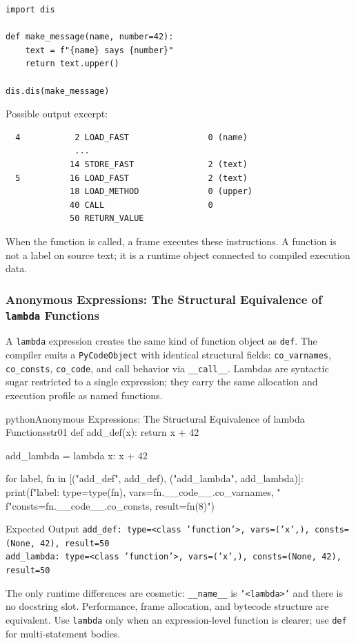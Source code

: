 \begin{verbatim}
import dis

def make_message(name, number=42):
    text = f"{name} says {number}"
    return text.upper()

dis.dis(make_message)
\end{verbatim}

Possible output excerpt:

\begin{verbatim}
  4           2 LOAD_FAST                0 (name)
              ...
             14 STORE_FAST               2 (text)
  5          16 LOAD_FAST                2 (text)
             18 LOAD_METHOD              0 (upper)
             40 CALL                     0
             50 RETURN_VALUE
\end{verbatim}

When the function is called, a frame executes these instructions. A function is not a label on source text; it is a runtime object connected to compiled execution data.

\subsubsection{Anonymous Expressions: The Structural Equivalence of \texttt{lambda} Functions}

A \texttt{lambda} expression creates the same kind of function object as \texttt{def}. The compiler emits a \texttt{PyCodeObject} with identical structural fields: \texttt{co\_varnames}, \texttt{co\_consts}, \texttt{co\_code}, and call behavior via \texttt{\_\_call\_\_}. Lambdas are syntactic sugar restricted to a single expression; they carry the same allocation and execution profile as named functions.

\begin{codebox}[]{python}{Anonymous Expressions: The Structural Equivalence of lambda Functions}{str01}
def add_def(x):
    return x + 42

add_lambda = lambda x: x + 42

for label, fn in [("add_def", add_def), ("add_lambda", add_lambda)]:
    print(f"{label}: type={type(fn)}, vars={fn.__code__.co_varnames}, "
          f"consts={fn.__code__.co_consts}, result={fn(8)}")
\end{codebox}


\begin{iobox}{Expected Output}
\texttt{add\_def: type=<class 'function'>, vars=('x',), consts=(None, 42), result=50} \\
\texttt{add\_lambda: type=<class 'function'>, vars=('x',), consts=(None, 42), result=50} \\
\end{iobox}




The only runtime differences are cosmetic: \texttt{\_\_name\_\_} is \texttt{'<lambda>'} and there is no docstring slot. Performance, frame allocation, and bytecode structure are equivalent. Use \texttt{lambda} only when an expression-level function is clearer; use \texttt{def} for multi-statement bodies.
